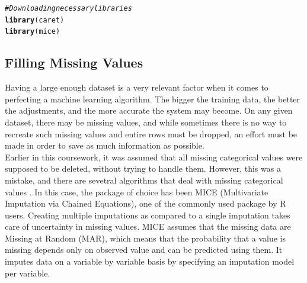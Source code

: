 \documentclass[a4paper,12pt]{article}\usepackage[]{graphicx}\usepackage[]{color}
\makeatletter
\newcommand{\hlcom}[1]{\textcolor[rgb]{0.678,0.584,0.686}{\textit{#1}}}%
\newcommand{\hlstd}[1]{\textcolor[rgb]{0.345,0.345,0.345}{#1}}%
\newcommand{\hlkwd}[1]{\textcolor[rgb]{0.737,0.353,0.396}{\textbf{#1}}}%
\newenvironment{kframe}{%
 \def\at@end@of@kframe{}%
 \ifinner\ifhmode%
  \def\at@end@of@kframe{\end{minipage}}%
  \begin{minipage}{\columnwidth}%
 \fi\fi%
 \def\FrameCommand##1{\hskip\@totalleftmargin \hskip-\fboxsep
 \colorbox{shadecolor}{##1}\hskip-\fboxsep
     \hskip-\linewidth \hskip-\@totalleftmargin \hskip\columnwidth}%
 \MakeFramed {\advance\hsize-\width
   \@totalleftmargin\z@ \linewidth\hsize
   \@setminipage}}%
 {\par\unskip\endMakeFramed%
 \at@end@of@kframe}
\newenvironment{knitrout}{}{} %
\makeatother
\begin{document}
\begin{knitrout}
\color{fgcolor}\begin{kframe}
\begin{alltt}
\hlcom{# Downloading necessary libraries}
\hlkwd{library}\hlstd{(caret)}
\hlkwd{library}\hlstd{(mice)}
\end{alltt}
\end{kframe}
\end{knitrout}

\clearpage

\subsection{Filling Missing Values}\label{filling_missing}
Having a large enough dataset is a very relevant factor when it comes to perfecting a machine learning algorithm. The bigger the training data, the better the adjustments, and the more accurate the system may become. On any given dataset, there may be missing values, and while sometimes there is no way to recreate such missing values and entire rows must be dropped, an effort must be made in order to save as much information as possible.\\
Earlier in this coursework, it was assumed that all missing categorical values were supposed to be deleted, without trying to handle them. However, this was a mistake, and there are sevetral algorithms that deal with missing categorical values \cite{mekala_2019}. In this case, the package of choice has been MICE (Multivariate Imputation via Chained Equations), one of the commonly used package by R users. Creating multiple imputations as compared to a single imputation takes care of uncertainty in missing values. MICE assumes that the missing data are Missing at Random (MAR), which means that the probability that a value is missing depends only on observed value and can be predicted using them. It imputes data on a variable by variable basis by specifying an imputation model per variable.
\end{document}
